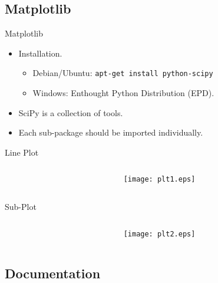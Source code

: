 \documentclass[dvips,xcolor=pst]{beamer}
\begin{document}
\subsection{
Matplotlib
}

\begin{frame}{
%
Matplotlib
%
}
\begin{itemize} \large
  \item Installation.
  \begin{itemize} \large
    \item Debian/Ubuntu: \texttt{apt-get install python-scipy}
    \item Windows: Enthought Python Distribution (EPD).
  \end{itemize}
  \item SciPy is a collection of tools.
  \item Each sub-package should be imported individually.
\end{itemize}
\end{frame}

\begin{frame}[fragile]{
%
Line Plot
%
}
\begin{columns}
\begin{column}{0.5\textwidth}

\end{column}
\begin{column}{0.5\textwidth}
  \texttt{[image: plt1.eps]}
\end{column}
\end{columns}
\end{frame}

\begin{frame}[fragile]{
%
Sub-Plot
%
}
\begin{columns}
\begin{column}{0.5\textwidth}

\end{column}
\begin{column}{0.5\textwidth}
  \texttt{[image: plt2.eps]}
\end{column}
\end{columns}
\end{frame}

\subsection{
Documentation
}
\end{document}
